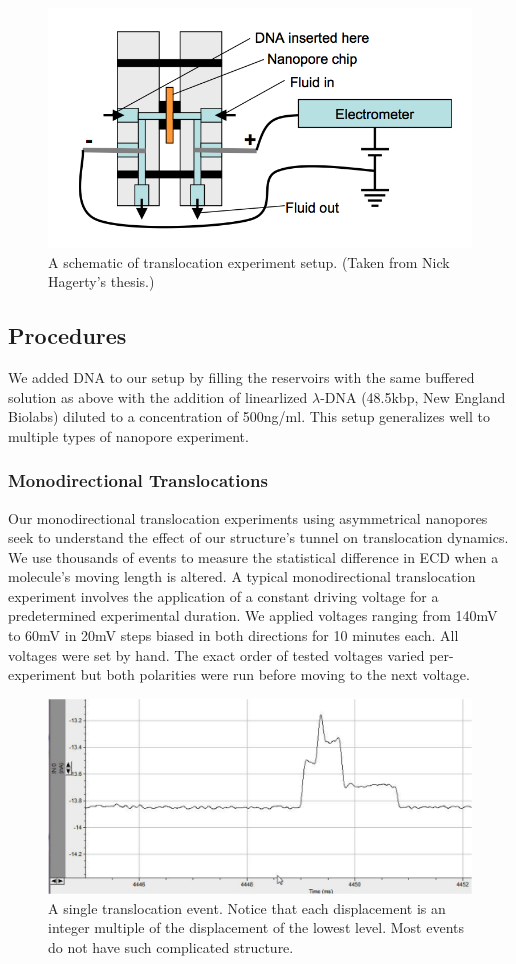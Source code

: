 \documentclass[aps,prl,preprint,groupedaddress]{revtex4}
\begin{document}
\begin{figure}
\centering
\includegraphics[width=.6\textwidth]{figures/chuck}
\caption{A schematic of translocation experiment setup. (Taken from Nick Hagerty's thesis.)}
\label{fig:chuck}
\end{figure}

\subsection{Procedures}

We added DNA to our setup by filling the reservoirs with the same buffered solution as above with the addition of linearlized $\lambda$-DNA (48.5kbp, New England Biolabs) diluted to a concentration of 500ng/ml.
This setup generalizes well to multiple types of nanopore experiment.

\subsubsection{Monodirectional Translocations}

Our monodirectional translocation experiments using asymmetrical nanopores seek to understand the effect of our structure's tunnel on translocation dynamics.
We use thousands of events to measure the statistical difference in ECD when a molecule's moving length is altered.
A typical monodirectional translocation experiment involves the application of a constant driving voltage for a predetermined experimental duration.
We applied voltages ranging from 140mV to 60mV in 20mV steps biased in both directions for 10 minutes each.
All voltages were set by hand.
The exact order of tested voltages varied per-experiment but both polarities were run before moving to the next voltage.
\begin{figure}[h]
\centering
\includegraphics[width=1\textwidth]{figures/one-event}
\caption{A single translocation event.
Notice that each displacement is an integer multiple of the displacement of the lowest level.
Most events do not have such complicated structure.}
\label{fig:one-event}
\end{figure}
\end{document}
